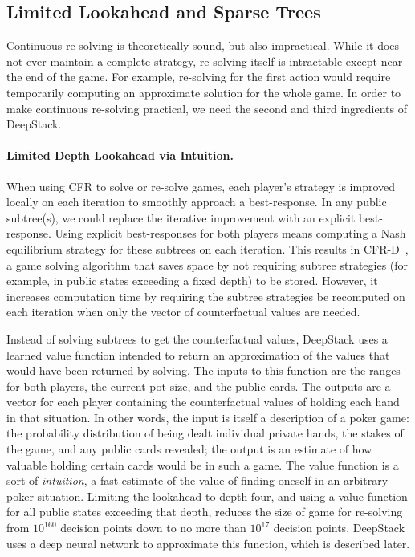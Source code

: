\documentclass[12pt]{article}
\begin{document}
\subsection*{Limited Lookahead and Sparse Trees}

Continuous re-solving is theoretically sound, but also impractical.  
While it does not ever maintain a complete strategy, re-solving itself is
intractable except near the end of the game. For example, re-solving for the first action would require temporarily computing an approximate solution for the whole game.  In order to make continuous re-solving practical, we need the second and third ingredients of DeepStack.  

\paragraph{Limited Depth Lookahead via Intuition.} 

When using CFR to solve or re-solve games, each player's strategy is improved locally on each iteration to smoothly approach a best-response.  In any public subtree(s), we could replace the iterative improvement with an explicit best-response.  Using explicit best-responses for both players means computing a Nash equilibrium strategy for these subtrees on each iteration.  This results in CFR-D~\cite{cprg:cfrd}, a game solving algorithm that saves space by not requiring subtree strategies (for example, in public states exceeding a fixed depth) to be stored.  However, it increases computation time by requiring the subtree strategies be recomputed on each iteration when only the vector of counterfactual values are needed.

Instead of solving subtrees to get the counterfactual values, DeepStack uses a learned value function intended to return an approximation of the values that would have been returned by solving. The inputs to this function
are the ranges for both players, the current pot size, and the public cards. 
The outputs are a vector for each player containing the counterfactual values of holding each hand in that situation.  In other words, the input is itself a description of a poker game: the probability distribution of being dealt individual private hands, the stakes of the game, and any public cards revealed; the output is an estimate of how valuable holding certain cards would be in such a game.  The value function is a sort of \emph{intuition}, a fast estimate of the value of finding oneself in an arbitrary poker situation.  Limiting the lookahead to depth four, and using a value function for all public states exceeding that depth, reduces the size of game for re-solving from $10^{160}$ decision points down to no more than $10^{17}$ decision points. DeepStack uses a deep neural network to approximate this function, which is described later.
\end{document}
